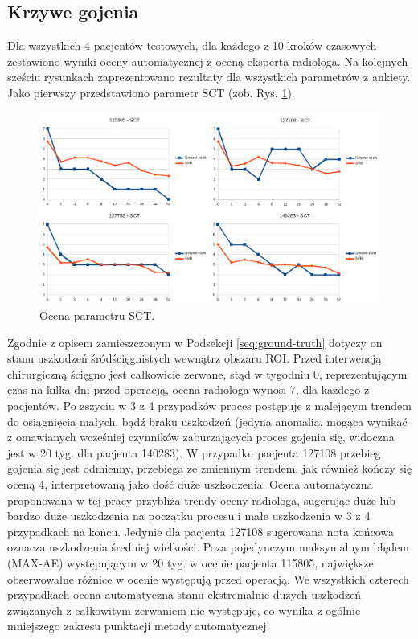 \subsection{Krzywe gojenia}
 Dla wszystkich 4 pacjentów testowych, dla każdego z 10 kroków czasowych zestawiono wyniki oceny automatycznej z oceną eksperta radiologa. Na kolejnych sześciu rysunkach zaprezentowano rezultaty dla wszystkich parametrów z ankiety. Jako pierwszy przedstawiono parametr SCT (zob. Rys. \ref{fig:SCT}).
\begin{figure}[h!]
	\centering
	\includegraphics[width=1\textwidth]{figures/SCT.png}
	\caption{Ocena parametru SCT.}\label{fig:SCT}
\end{figure}
Zgodnie z opisem zamieszczonym w Podsekcji \ref{seq:ground-truth} dotyczy on stanu uszkodzeń śródścięgnistych wewnątrz obszaru ROI. Przed interwencją chirurgiczną ścięgno jest całkowicie zerwane, stąd w tygodniu 0, reprezentującym czas na kilka dni przed operacją, ocena radiologa wynosi 7, dla każdego z pacjentów. Po zszyciu w 3 z 4 przypadków proces postępuje z malejącym trendem do osiągnięcia małych, bądź braku uszkodzeń (jedyna anomalia, mogąca wynikać z omawianych wcześniej czynników zaburzających proces gojenia się, widoczna jest w 20 tyg. dla pacjenta 140283). W przypadku pacjenta 127108 przebieg gojenia się jest odmienny, przebiega ze zmiennym trendem, jak również kończy się oceną 4, interpretowaną jako dość duże uszkodzenia. Ocena automatyczna proponowana w tej pracy przybliża trendy oceny radiologa, sugerując duże lub bardzo duże uszkodzenia na początku procesu i małe uszkodzenia w 3 z 4 przypadkach na końcu. Jedynie dla pacjenta 127108 sugerowana nota końcowa oznacza uszkodzenia średniej wielkości. Poza pojedynczym maksymalnym błędem (MAX-AE) występującym w 20 tyg. w ocenie pacjenta 115805, największe obserwowalne różnice w ocenie występują przed operacją. We wszystkich czterech przypadkach ocena automatyczna stanu ekstremalnie dużych uszkodzeń związanych z całkowitym zerwaniem nie występuje, co wynika z ogólnie mniejszego zakresu punktacji metody automatycznej. 

